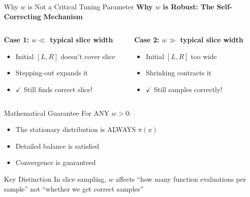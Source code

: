 \documentclass[aspectratio=169]{beamer}
\begin{document}
\begin{frame}{Why $w$ is Not a Critical Tuning Parameter}
	\textbf{Why $w$ is Robust: The Self-Correcting Mechanism}

	\begin{columns}[T]
		\begin{column}{0.48\textwidth}
			\textbf{Case 1: $w \ll$ typical slice width}
			\begin{itemize}
				\item Initial $[L, R]$ doesn't cover slice
				\item Stepping-out expands it
				\item $\checkmark$ Still finds correct slice!
			\end{itemize}
		\end{column}
		\begin{column}{0.48\textwidth}
			\textbf{Case 2: $w \gg$ typical slice width}
			\begin{itemize}
				\item Initial $[L, R]$ too wide
				\item Shrinking contracts it
				\item $\checkmark$ Still samples correctly!
			\end{itemize}
		\end{column}
	\end{columns}

	\begin{block}{Mathematical Guarantee}
		For ANY $w > 0$:
		\begin{itemize}
			\item The stationary distribution is ALWAYS $\pi(x)$
			\item Detailed balance is satisfied
			\item Convergence is guaranteed
		\end{itemize}
	\end{block}

	\begin{alertblock}{Key Distinction}
		In slice sampling, $w$ affects ``how many function evaluations per sample'' not ``whether we get correct samples''
	\end{alertblock}
\end{frame}
\end{document}
